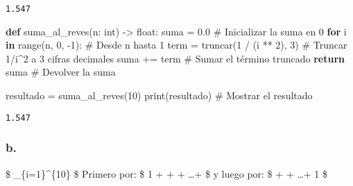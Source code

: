 \documentclass[
  letterpaper,
  DIV=11,
  numbers=noendperiod]{scrartcl}
\newenvironment{Shaded}{\begin{snugshade}}{\end{snugshade}}
\newcommand{\BuiltInTok}[1]{\textcolor[rgb]{0.00,0.23,0.31}{#1}}
\newcommand{\CommentTok}[1]{\textcolor[rgb]{0.37,0.37,0.37}{#1}}
\newcommand{\ControlFlowTok}[1]{\textcolor[rgb]{0.00,0.23,0.31}{\textbf{#1}}}
\newcommand{\DecValTok}[1]{\textcolor[rgb]{0.68,0.00,0.00}{#1}}
\newcommand{\FloatTok}[1]{\textcolor[rgb]{0.68,0.00,0.00}{#1}}
\newcommand{\KeywordTok}[1]{\textcolor[rgb]{0.00,0.23,0.31}{\textbf{#1}}}
\newcommand{\NormalTok}[1]{\textcolor[rgb]{0.00,0.23,0.31}{#1}}
\newcommand{\OperatorTok}[1]{\textcolor[rgb]{0.37,0.37,0.37}{#1}}
\begin{document}
\begin{verbatim}
1.547
\end{verbatim}

\begin{Shaded}
\begin{Highlighting}[]
\KeywordTok{def}\NormalTok{ suma\_al\_reves(n: }\BuiltInTok{int}\NormalTok{) }\OperatorTok{{-}\textgreater{}} \BuiltInTok{float}\NormalTok{:}
\NormalTok{    suma }\OperatorTok{=} \FloatTok{0.0}  \CommentTok{\# Inicializar la suma en 0}
    \ControlFlowTok{for}\NormalTok{ i }\KeywordTok{in} \BuiltInTok{range}\NormalTok{(n, }\DecValTok{0}\NormalTok{, }\OperatorTok{{-}}\DecValTok{1}\NormalTok{):  }\CommentTok{\# Desde n hasta 1}
\NormalTok{        term }\OperatorTok{=}\NormalTok{ truncar(}\DecValTok{1} \OperatorTok{/}\NormalTok{ (i }\OperatorTok{**} \DecValTok{2}\NormalTok{), }\DecValTok{3}\NormalTok{)  }\CommentTok{\# Truncar 1/i\^{}2 a 3 cifras decimales}
\NormalTok{        suma }\OperatorTok{+=}\NormalTok{ term  }\CommentTok{\# Sumar el término truncado}
    \ControlFlowTok{return}\NormalTok{ suma  }\CommentTok{\# Devolver la suma}

\NormalTok{resultado }\OperatorTok{=}\NormalTok{ suma\_al\_reves(}\DecValTok{10}\NormalTok{)}
\BuiltInTok{print}\NormalTok{(resultado)  }\CommentTok{\# Mostrar el resultado}
\end{Highlighting}
\end{Shaded}

\begin{verbatim}
1.547
\end{verbatim}

\subsubsection{b.}\label{b.}

\$ \sum\_\{i=1\}\^{}\{10\}  \$ Primero por: \$ 1 +
 +  + \ldots +  \$ y luego por: \$
 +  + \ldots + 1 \$
\end{document}
